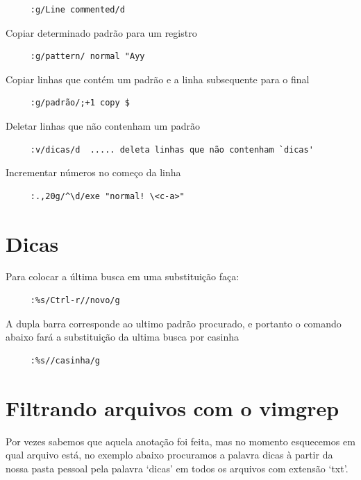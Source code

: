 \documentclass[10pt,a4paper,openany]{book}
\begin{document}
\begin{verbatim}
     :g/Line commented/d
\end{verbatim}

Copiar determinado padrão para um registro

\begin{verbatim}
     :g/pattern/ normal "Ayy
\end{verbatim}

Copiar linhas que contém um padrão e a linha subsequente para o final

\begin{verbatim}
     :g/padrão/;+1 copy $
\end{verbatim}

Deletar linhas que não contenham um padrão

\begin{verbatim}
     :v/dicas/d  ..... deleta linhas que não contenham `dicas'
\end{verbatim}

Incrementar números no começo da linha

\begin{verbatim}
     :.,20g/^\d/exe "normal! \<c-a>"
\end{verbatim}

\section{Dicas }
Para colocar a última busca em uma substituição faça:

\begin{verbatim}
     :%s/Ctrl-r//novo/g
\end{verbatim}

A dupla barra corresponde ao ultimo padrão procurado, e portanto o
comando abaixo fará a substituição da ultima busca por casinha

\begin{verbatim}
     :%s//casinha/g
\end{verbatim}

\section{Filtrando arquivos com o vimgrep}
\label{Filtrando arquivos com o vimgrep}

Por vezes sabemos que aquela anotação foi feita, mas no momento esquecemos em qual
arquivo está, no exemplo abaixo procuramos a palavra dicas à partir da nossa pasta pessoal
pela palavra `dicas' em todos os arquivos com extensão `txt'.
\end{document}
